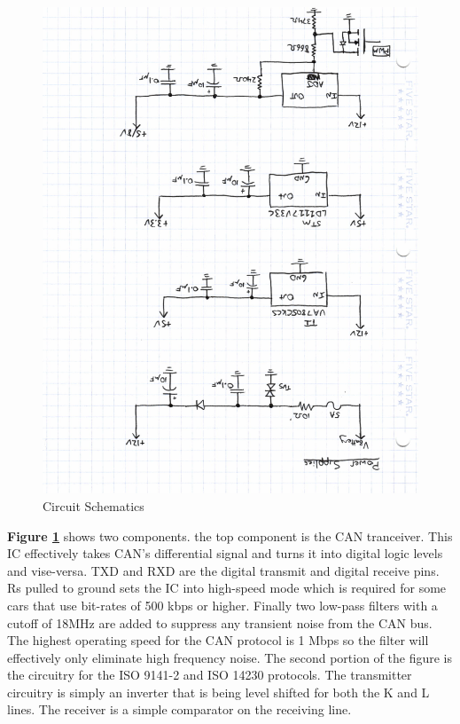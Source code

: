 \documentclass[12pt,letterpaper]{article}
\begin{document}
\begin{figure}[H]
\centering
\includegraphics[page=4, totalheight=20cm, angle=180]{images/circuit_sch.pdf}
\caption{Circuit Schematics}
\label{fig:can}
\end{figure}

\textbf{Figure \ref{fig:can}} shows two components. the top component is the CAN tranceiver. This IC effectively takes CAN's differential signal and turns it into digital logic levels and vise-versa. TXD and RXD are the digital transmit and digital receive pins. Rs pulled to ground sets the IC into high-speed mode which is required for some cars that use bit-rates of 500 kbps or higher. Finally two low-pass filters with a cutoff of 18MHz are added to suppress any transient noise from the CAN bus. The highest operating speed for the CAN protocol is 1 Mbps so the filter will effectively only eliminate high frequency noise. The second portion of the figure is the circuitry for the ISO 9141-2 and ISO 14230 protocols. The transmitter circuitry is simply an inverter that is being level shifted for both the K and L lines. The receiver is a simple comparator on the receiving line.
\end{document}
